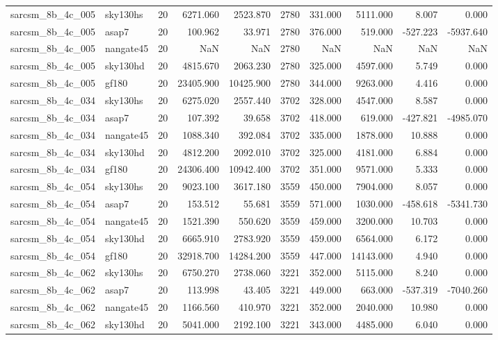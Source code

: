 \begin{tabular}{llrrrrrrrr}
sarcsm\_8b\_4c\_005 & sky130hs & 20 & 6271.060 & 2523.870 & 2780 & 331.000 & 5111.000 & 8.007 & 0.000 \\
sarcsm\_8b\_4c\_005 & asap7 & 20 & 100.962 & 33.971 & 2780 & 376.000 & 519.000 & -527.223 & -5937.640 \\
sarcsm\_8b\_4c\_005 & nangate45 & 20 & NaN & NaN & 2780 & NaN & NaN & NaN & NaN \\
sarcsm\_8b\_4c\_005 & sky130hd & 20 & 4815.670 & 2063.230 & 2780 & 325.000 & 4597.000 & 5.749 & 0.000 \\
sarcsm\_8b\_4c\_005 & gf180 & 20 & 23405.900 & 10425.900 & 2780 & 344.000 & 9263.000 & 4.416 & 0.000 \\
sarcsm\_8b\_4c\_034 & sky130hs & 20 & 6275.020 & 2557.440 & 3702 & 328.000 & 4547.000 & 8.587 & 0.000 \\
sarcsm\_8b\_4c\_034 & asap7 & 20 & 107.392 & 39.658 & 3702 & 418.000 & 619.000 & -427.821 & -4985.070 \\
sarcsm\_8b\_4c\_034 & nangate45 & 20 & 1088.340 & 392.084 & 3702 & 335.000 & 1878.000 & 10.888 & 0.000 \\
sarcsm\_8b\_4c\_034 & sky130hd & 20 & 4812.200 & 2092.010 & 3702 & 325.000 & 4181.000 & 6.884 & 0.000 \\
sarcsm\_8b\_4c\_034 & gf180 & 20 & 24306.400 & 10942.400 & 3702 & 351.000 & 9571.000 & 5.333 & 0.000 \\
sarcsm\_8b\_4c\_054 & sky130hs & 20 & 9023.100 & 3617.180 & 3559 & 450.000 & 7904.000 & 8.057 & 0.000 \\
sarcsm\_8b\_4c\_054 & asap7 & 20 & 153.512 & 55.681 & 3559 & 571.000 & 1030.000 & -458.618 & -5341.730 \\
sarcsm\_8b\_4c\_054 & nangate45 & 20 & 1521.390 & 550.620 & 3559 & 459.000 & 3200.000 & 10.703 & 0.000 \\
sarcsm\_8b\_4c\_054 & sky130hd & 20 & 6665.910 & 2783.920 & 3559 & 459.000 & 6564.000 & 6.172 & 0.000 \\
sarcsm\_8b\_4c\_054 & gf180 & 20 & 32918.700 & 14284.200 & 3559 & 447.000 & 14143.000 & 4.940 & 0.000 \\
sarcsm\_8b\_4c\_062 & sky130hs & 20 & 6750.270 & 2738.060 & 3221 & 352.000 & 5115.000 & 8.240 & 0.000 \\
sarcsm\_8b\_4c\_062 & asap7 & 20 & 113.998 & 43.405 & 3221 & 449.000 & 663.000 & -537.319 & -7040.260 \\
sarcsm\_8b\_4c\_062 & nangate45 & 20 & 1166.560 & 410.970 & 3221 & 352.000 & 2040.000 & 10.980 & 0.000 \\
sarcsm\_8b\_4c\_062 & sky130hd & 20 & 5041.000 & 2192.100 & 3221 & 343.000 & 4485.000 & 6.040 & 0.000 \\

\end{tabular}

